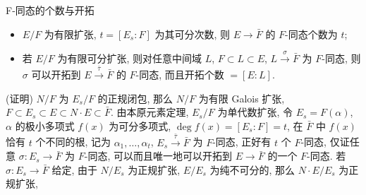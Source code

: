 \begin{frame}{F-同态的个数与开拓}

\begin{lem}[F-同态的个数与开拓]
\begin{itemize}
\item[(i)] $E/F$ 为有限扩张, $t = [E_s:F]$ 为其可分次数, 则
  $E \to \bar{F}$ 的 $F$-同态个数为 $t$;
\item[(ii)] 若 $E/F$ 为有限可分扩张, 则对任意中间域 $L$, $F \subset L \subset E$,
  $L \xrightarrow{\ \sigma\ } \bar{F}$ 为 $F$-同态, 则 $\sigma$ 可以开拓到
  $E \xrightarrow{\ \bar{\tau}\ } \bar{F}$ 的 $F$-同态, 而且开拓个数 $= [E:L]$.
\end{itemize}
\end{lem}

\startproof[bg=yellow, fg=red](证明)
$N/F$ 为 $E_s/F$ 的正规闭包, 那么 $N/F$ 为有限 Galois 扩张,
$F \subset E_s \subset E \subset N \cdot E \subset \bar{F}$.
由本原元素定理, $E_s/F$ 为单代数扩张,
令 $E_s = F(\alpha)$, $\alpha$ 的极小多项式 $f(x)$ 为可分多项式,
$\deg f(x) = [E_s:F] = t$,
在 $\bar{F}$ 中 $f(x)$ 恰有 $t$ 个不同的根, 记为 $\alpha_1, \dots, \alpha_t$,
$E_s \xrightarrow{\ \bar{\tau}\ } \bar{F}$ 为 $F$-同态,
正好有 $t$ 个 $F$-同态, 仅证任意 $\sigma: E_s \to \bar{F}$ 为 $F$-同态,
可以而且唯一地可以开拓到 $E \to \bar{F}$ 的一个 $F$-同态.
若 $\sigma: E_s \to \bar{F}$ 给定, 由于 $N/E_s$ 为正规扩张,
$E/E_s$ 为纯不可分的, 那么 $N \cdot E/E_s$ 为正规扩张,

\end{frame}


